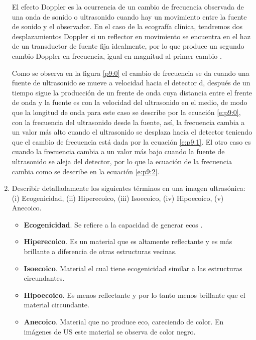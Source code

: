\begin{enumerate}
\begin{adjustbox}{valign=T,raise=\strutheight,minipage={\linewidth}}
El efecto Doppler es la ocurrencia de un cambio de frecuencia observada de una onda de sonido o ultrasonido cuando hay un movimiento entre  la fuente de sonido y el observador. En el caso de la ecografía clínica, tendremos dos desplazamientos Doppler si un reflector en movimiento se encuentra en el haz de un transductor de fuente fija idealmente, por lo que produce un segundo cambio Doppler en frecuencia, igual en magnitud al primer cambio \citep{matthew}. 

Como se observa en la figura \ref{p9:0}  el cambio de frecuencia se da cuando una fuente de ultrasonido se mueve a velocidad  hacia el detector d, después de un tiempo  sigue la producción de un frente de onda cuya distancia entre el frente de onda y la fuente es  con  la velocidad del ultrasonido en el medio, de modo que la longitud de onda para este caso se describe por la ecuación \ref{e:p9:0}, con  la frecuencia del ultrasonido desde la fuente, así, la frecuencia cambia a un valor más alto cuando el ultrasonido se desplaza hacia el detector teniendo que el cambio de frecuencia está dada por la ecuación \ref{e:p9:1}. El otro caso es cuando la frecuencia cambia a un valor más bajo cuando la fuente de ultrasonido se aleja del detector, por lo que la ecuación de la frecuencia cambia como se describe en la ecuación \ref{e:p9:2}.
\end{adjustbox}


\pagebreak

  \item Describir detalladamente los siguientes términos en una imagen ultrasónica: (i)  Ecogenicidad, (ii) Hiperecoico, (iii) Isoecoico, (iv) Hipoecoico, (v) Anecoico.
  
\begin{itemize}%
  \item \textbf{Ecogenicidad}. Se refiere a la capacidad de generar ecos \citep{famus}.
  \item \textbf{Hiperecoico}. Es un material que es altamente reflectante y es más brillante a diferencia de otras estructuras vecinas.
  \item \textbf{Isoecoico}. Material el cual tiene ecogenicidad similar a las estructuras circundantes.
  \item \textbf{Hipoecoico}. Es menos reflectante y por lo tanto menos brillante que el material circundante.
  \item \textbf{Anecoico}. Material que no produce eco, careciendo de color. En imágenes de US este material se observa de color negro.
\end{itemize}

\end{enumerate}








